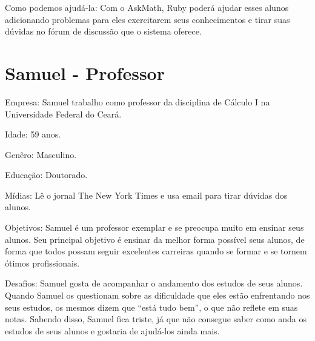 Como podemos ajudá-la: Com o AskMath, Ruby poderá ajudar esses alunos adicionando problemas para eles exercitarem seus conhecimentos e tirar suas d\'uvidas no f\'orum de discuss\~ao que 
o sistema oferece.

\section{Samuel - Professor}

\begin{figure}[h!]
  \centering
\end{figure}

Empresa: Samuel trabalho como professor da disciplina de C\'alculo I na
Universidade Federal do Ceará.

Idade: 59 anos.

Genêro: Masculino.

Educação: Doutorado.

Mídias: Lê o jornal The New York Times e usa email para tirar dúvidas dos alunos.

Objetivos: Samuel é um professor exemplar e se preocupa muito em ensinar seus 
alunos. Seu principal objetivo é ensinar da melhor forma possível seus alunos, 
de forma que todos possam seguir excelentes carreiras quando se formar e se 
tornem ótimos profissionais.

Desafios: Samuel gosta de acompanhar o andamento dos estudos de seus alunos. Quando Samuel os questionam sobre as dificuldade que eles est\~ao enfrentando nos seus estudos, os mesmos dizem que ``está 
tudo bem'', o que não reflete em suas notas. Sabendo disso, Samuel fica triste, já que não consegue saber como anda os estudos de seus alunos e gostaria de ajudá-los ainda mais.

